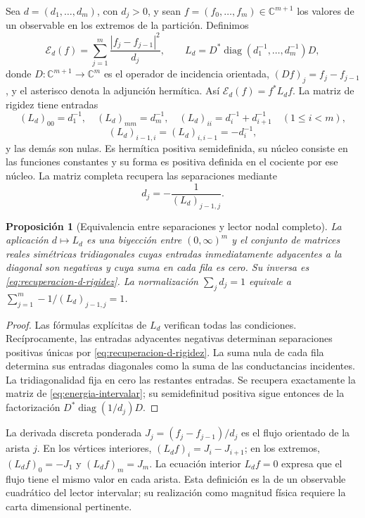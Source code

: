 \documentclass[a4paper,10pt]{article}
\newtheorem{proposition}[theorem]{Proposición}
\theoremstyle{definition}\newtheorem{definition}[theorem]{Definición}
\theoremstyle{remark}\newtheorem{remark}[theorem]{Observación}
\numberwithin{equation}{section}
\begin{document}
Sea \(d=(d_1,\ldots,d_m)\), con \(d_j>0\), y sean
\(f=(f_0,\ldots,f_m)\in\mathbb C^{m+1}\) los valores de un observable
en los extremos de la partición. Definimos
\begin{equation}
 \mathcal E_d(f)=\sum_{j=1}^{m}\frac{|f_j-f_{j-1}|^2}{d_j},
 \qquad L_d=D^*\operatorname{diag}(d_1^{-1},\ldots,d_m^{-1})D,
 \label{eq:energia-intervalar}
\end{equation}
donde \(D:\mathbb C^{m+1}\to\mathbb C^m\) es el operador de
incidencia orientada, \((Df)_j=f_j-f_{j-1}\), y el asterisco denota la
adjunción hermítica. Así \(\mathcal E_d(f)=f^*L_df\).
La matriz de rigidez tiene entradas
\[
 (L_d)_{00}=d_1^{-1},\quad (L_d)_{mm}=d_m^{-1},\quad
 (L_d)_{ii}=d_i^{-1}+d_{i+1}^{-1}\quad(1\le i<m),
\]
\[
 (L_d)_{i-1,i}=(L_d)_{i,i-1}=-d_i^{-1},
\]
y las demás son nulas. Es hermítica positiva semidefinida, su núcleo
consiste en las funciones constantes y su forma es positiva definida
en el cociente por ese núcleo. La matriz completa recupera las
separaciones mediante
\begin{equation}
 d_j=-\frac1{(L_d)_{j-1,j}}.
 \label{eq:recuperacion-d-rigidez}
\end{equation}

\begin{proposition}[Equivalencia entre separaciones y lector nodal completo]
\label{prop:energia-bidireccional}
La aplicación \(d\mapsto L_d\) es una biyección entre
\((0,\infty)^m\) y el conjunto de matrices reales simétricas
tridiagonales cuyas entradas inmediatamente adyacentes a la diagonal son
negativas y cuya suma en cada fila es cero. Su inversa es
\eqref{eq:recuperacion-d-rigidez}. La normalización \(\sum_jd_j=1\)
equivale a \(\sum_{j=1}^m-1/(L_d)_{j-1,j}=1\).
\end{proposition}
\begin{proof}
Las fórmulas explícitas de \(L_d\) verifican todas las condiciones.
Recíprocamente, las entradas adyacentes negativas determinan separaciones
positivas únicas por \eqref{eq:recuperacion-d-rigidez}. La suma nula de
cada fila determina sus entradas diagonales como la suma de las
conductancias incidentes. La tridiagonalidad fija en cero las restantes
entradas. Se recupera exactamente la matriz de
\eqref{eq:energia-intervalar}; su semidefinitud positiva sigue entonces
de la factorización \(D^*\operatorname{diag}(1/d_j)D\).
\end{proof}

La derivada discreta ponderada
\(J_j=(f_j-f_{j-1})/d_j\) es el flujo orientado de la arista \(j\).
En los vértices interiores, \((L_df)_i=J_i-J_{i+1}\); en los extremos,
\((L_df)_0=-J_1\) y \((L_df)_m=J_m\). La ecuación interior
\(L_df=0\) expresa que el flujo tiene el mismo valor en cada arista.
Esta definición es la de un observable cuadrático del lector intervalar;
su realización como magnitud física requiere la carta dimensional pertinente.
\end{document}
